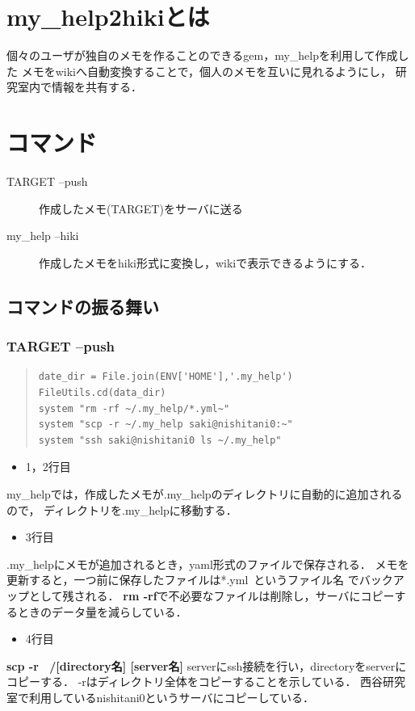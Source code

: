 \section{my\_help2hikiとは}
個々のユーザが独自のメモを作ることのできるgem，my\_helpを利用して作成した
メモをwikiへ自動変換することで，個人のメモを互いに見れるようにし，
研究室内で情報を共有する．

\section{コマンド}\begin{description}
\item[TARGET --push]  作成したメモ(TARGET)をサーバに送る

\item[my\_help --hiki]  作成したメモをhiki形式に変換し，wikiで表示できるようにする．

\end{description}
\subsection{コマンドの振る舞い}
\subsubsection{TARGET --push}\begin{quote}\begin{verbatim}
date_dir = File.join(ENV['HOME'],'.my_help')
FileUtils.cd(data_dir)
system "rm -rf ~/.my_help/*.yml~"
system "scp -r ~/.my_help saki@nishitani0:~"
system "ssh saki@nishitani0 ls ~/.my_help"
\end{verbatim}\end{quote}
\begin{itemize}
\item 1，2行目
\end{itemize}
my\_helpでは，作成したメモが.my\_helpのディレクトリに自動的に追加されるので，
ディレクトリを.my\_helpに移動する．

\begin{itemize}
\item 3行目
\end{itemize}
.my\_helpにメモが追加されるとき，yaml形式のファイルで保存される．
メモを更新すると，一つ前に保存したファイルは*.yml~というファイル名
でバックアップとして残される．
\textbf{rm -rf}で不必要なファイルは削除し，サーバにコピーするときのデータ量を減らしている．

\begin{itemize}
\item 4行目
\end{itemize}
\textbf{scp -r ~/[directory名] [server名]}
serverにssh接続を行い，directoryをserverにコピーする．
-rはディレクトリ全体をコピーすることを示している．
西谷研究室で利用しているnishitani0というサーバにコピーしている．

